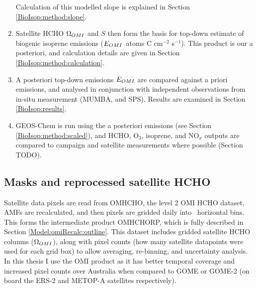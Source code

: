 \begin{enumerate}
        Calculation of this modelled slope is explained in Section \ref{BioIsop:method:slope}.
      \item 
        Satellite HCHO $\Omega_{OMI}$ and $S$ then form the basis for top-down estimate of biogenic isoprene emissions ($E_{OMI}$~atoms C cm$^{-2}$ s$^{-1}$).
        This product is our a posteriori, and calculation details are given in Section \ref{BioIsop:method:calculation}.
      \item 
        A posteriori top-down emissions $E_{OMI}$ are compared against a priori emissions, and analysed in conjunction with independent observations from in-situ measurement (MUMBA, and SPS).
        Results are examined in Section \ref{BioIsop:results}.
      \item 
        GEOS-Chem is run using the a posteriori emissions (see Section \ref{BioIsop:method:scaled}), and HCHO, O$_3$, isoprene, and NO$_x$ outputs are compared to campaign and satellite measurements where possible (Section TODO).
    \end{enumerate}
    
    
  

  \subsection{Masks and reprocessed satellite HCHO}
    
    Satellite data pixels are read from OMHCHO, the level 2 OMI HCHO dataset, AMFs are recalculated, and then pixels are gridded daily into \highhr ~horizontal bins. 
    This forms the intermediate product OMHCHORP, which is fully described in Section \ref{Model:omiRecalc:outline}.
    This dataset includes gridded satellite HCHO columns ($\Omega_{OMI}$), along with pixel counts (how many satellite datapoints were used for each grid box) to allow averaging, re-binning, and uncertainty analysis.
    In this thesis I use the OMI product as it has better temporal coverage and increased pixel counts over Australia when compared to GOME or GOME-2 (on board the ERS-2 and METOP-A satellites respectively).
    
